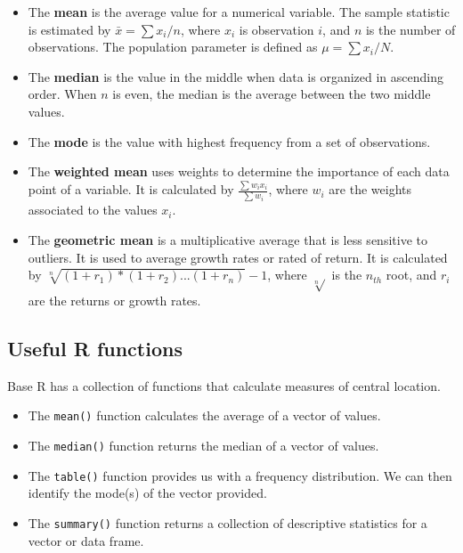 \documentclass[
  letterpaper,
  DIV=11,
  numbers=noendperiod]{scrreprt}
\begin{document}
\begin{itemize}
\item
  The \textbf{mean} is the average value for a numerical variable. The
  sample statistic is estimated by \(\bar{x}=\sum x_{i}/n\), where
  \(x_i\) is observation \(i\), and \(n\) is the number of observations.
  The population parameter is defined as \(\mu=\sum x_{i}/N\).
\item
  The \textbf{median} is the value in the middle when data is organized
  in ascending order. When \(n\) is even, the median is the average
  between the two middle values.
\item
  The \textbf{mode} is the value with highest frequency from a set of
  observations.
\item
  The \textbf{weighted mean} uses weights to determine the importance of
  each data point of a variable. It is calculated by
  \(\frac{\sum w_{i}x_{i}}{\sum w_{i}}\), where \(w_{i}\) are the
  weights associated to the values \(x_{i}\).
\item
  The \textbf{geometric mean} is a multiplicative average that is less
  sensitive to outliers. It is used to average growth rates or rated of
  return. It is calculated by \(\sqrt[n]{(1+r_1)*(1+r_2)...(1+r_n)}-1\),
  where \(\sqrt[n]{}\) is the \(n_{th}\) root, and \(r_i\) are the
  returns or growth rates.
\end{itemize}

\hypertarget{useful-r-functions-2}{%
\subsection*{Useful R functions}\label{useful-r-functions-2}}

Base R has a collection of functions that calculate measures of central
location.

\begin{itemize}
\item
  The \texttt{mean()} function calculates the average of a vector of
  values.
\item
  The \texttt{median()} function returns the median of a vector of
  values.
\item
  The \texttt{table()} function provides us with a frequency
  distribution. We can then identify the mode(s) of the vector provided.
\item
  The \texttt{summary()} function returns a collection of descriptive
  statistics for a vector or data frame.
\end{itemize}
\end{document}
